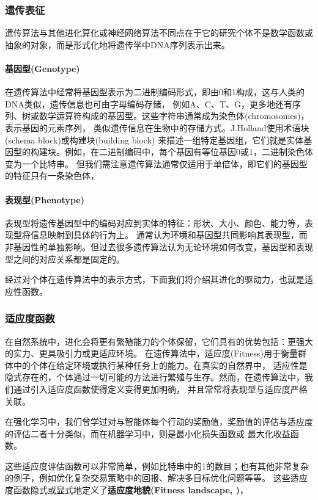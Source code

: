 \documentclass[12pt, a4paper, oneside]{ctexart}
\numberwithin{equation}{section}  %
\begin{document}
\subsubsection{遗传表征}
遗传算法与其他进化算化或神经网络算法不同点在于它的研究个体不是数学函数或抽象的对象，而是形式化地将遗传学中DNA序列表示出来。

\paragraph{基因型(Genotype)}在遗传算法中经常将基因型表示为二进制编码形式，即由0和1构成，这与人类的DNA类似，遗传信息也可由字母编码存储，
例如A、C、T、G，更多地还有序列、树或数学运算符构成的基因型。这些字符串通常成为染色体(chromosomes)，表示基因的元素序列，
类似遗传信息在生物中的存储方式。J.Holland\cite{bib-Holland1992}使用术语块(schema block)或构建块(building block)
来描述一组特定基因组，它们就是实体基因型的构建块。例如，在二进制编码中，每个基因有等位基因0或1，二进制染色体变为一个比特串。
但我们需注意遗传算法通常仅适用于单倍体，即它们的基因型的特征只有一条染色体，
\paragraph{表现型(Phenotype)}表现型将遗传基因型中的编码对应到实体的特征：形状、大小、颜色、能力等，表现型将信息映射到具体的行为上。
通常认为环境和基因型共同影响其表现型，而非基因性的单独影响。但过去很多遗传算法认为无论环境如何改变，基因型和表现型之间的对应关系都是固定的。

经过对个体在遗传算法中的表示方式，下面我们将介绍其进化的驱动力，也就是适应性函数。
\subsubsection{适应度函数}
在自然系统中，进化会将更有繁殖能力的个体保留，它们具有的优势包括：更强大的实力、更具吸引力或更适应环境。
在遗传算法中，适应度(Fitness)用于衡量群体中的个体在给定环境或执行某种任务上的能力。在真实的自然界中，
适应性是隐式存在的，个体通过一切可能的方法进行繁殖与生存。然而，在遗传算法中，我们通过引入适应度函数使得定义变得更加明确，
并且常常将表现型与适应度严格关联。

在强化学习中，我们曾学过对与智能体每个行动的奖励值，奖励值的评估与适应度的评估二者十分类似，而在机器学习中，则是最小化损失函数或
最大化收益函数。

这些适应度评估函数可以非常简单，例如比特串中的1的数目；也有其他非常复杂的例子，例如优化复杂交易策略中的回报、解决多目标优化问题等等。
这些适应度函数隐式或显式地定义了\textbf{适应度地貌(Fitness landscape, \cite{bib-Wright1931})}，
\end{document}
